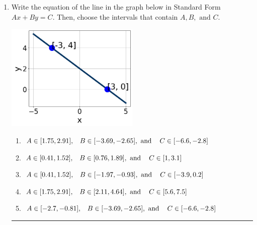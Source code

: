 \documentclass[14pt]{extbook}
\newcommand{\litem}[1]{\item#1\hspace*{-1cm}\rule{\textwidth}{0.4pt}}
\begin{document}
\begin{enumerate}
{\begin{enumerate}[label=\Alph*.]
\end{enumerate} }
\litem{
Write the equation of the line in the graph below in Standard Form $Ax+By=C$. Then, choose the intervals that contain $A, B, \text{ and } C$.
\begin{center}
    \includegraphics[width=0.5\textwidth]{../Figures/linearGraphToStandardA.png}
\end{center}
\begin{enumerate}[label=\Alph*.]
\item \( A \in [1.75, 2.91], \hspace{3mm} B \in [-3.69, -2.65], \text{ and } \hspace{3mm} C \in [-6.6, -2.8] \)
\item \( A \in [0.41, 1.52], \hspace{3mm} B \in [0.76, 1.89], \text{ and } \hspace{3mm} C \in [1, 3.1] \)
\item \( A \in [0.41, 1.52], \hspace{3mm} B \in [-1.97, -0.93], \text{ and } \hspace{3mm} C \in [-3.9, 0.2] \)
\item \( A \in [1.75, 2.91], \hspace{3mm} B \in [2.11, 4.64], \text{ and } \hspace{3mm} C \in [5.6, 7.5] \)
\item \( A \in [-2.7, -0.81], \hspace{3mm} B \in [-3.69, -2.65], \text{ and } \hspace{3mm} C \in [-6.6, -2.8] \)


\end{enumerate}}
\end{enumerate}
\end{document}
